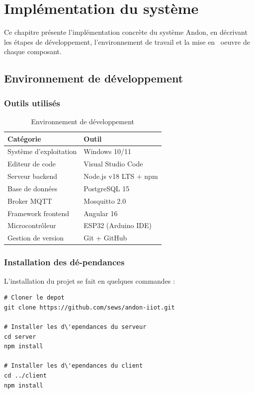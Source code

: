 \chapter{Impl\'ementation du syst\`eme}

Ce chapitre pr\'esente l'impl\'ementation concr\`ete du syst\`eme Andon, en d\'ecrivant les \'etapes de d\'eveloppement, l'environnement de travail et la mise en \ oeuvre de chaque composant.

\section{Environnement de d\'eveloppement}

\subsection{Outils utilis\'es}

\begin{table}[htbp]
\centering
\renewcommand{\arraystretch}{1.3}
\begin{tabular}{l l}
\toprule
\textbf{Cat\'egorie} & \textbf{Outil} \\
\midrule
Syst\`eme d'exploitation & Windows 10/11 \\
Editeur de code & Visual Studio Code \\
Serveur backend & Node.js v18 LTS + npm \\
Base de donn\'ees & PostgreSQL 15 \\
Broker MQTT & Mosquitto 2.0 \\
Framework frontend & Angular 16 \\
Microcontr\^oleur & ESP32 (Arduino IDE) \\
Gestion de version & Git + GitHub \\
\bottomrule
\end{tabular}
\caption{Environnement de d\'eveloppement}
\label{tab:environnement_dev}
\end{table}

\subsection{Installation des d\'e-pendances}

L'installation du projet se fait en quelques commandes :

\begin{lstlisting}[caption={Installation du backend},label={lst:install_backend}]
# Cloner le depot
git clone https://github.com/sews/andon-iiot.git

# Installer les d\'ependances du serveur
cd server
npm install

# Installer les d\'ependances du client
cd ../client
npm install
\end{lstlisting}

